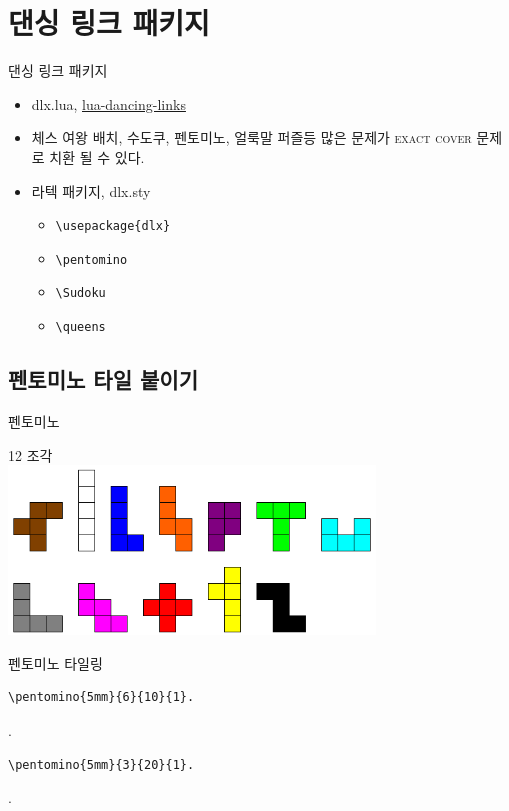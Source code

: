 \documentclass[xcolor=svgnames]{beamer}
\begin{document}
\section{댄싱 링크 패키지}

%
\begin{frame}[fragile]{댄싱 링크 패키지}
  \begin{itemize}
    \setlength\itemsep{1em}
  \item \alert{dlx.lua,} \href{https://github.com/sjnam/lua-dancing-links}
    {lua-dancing-links}
  \item 체스 여왕 배치, 수도쿠, 펜토미노, 얼룩말 퍼즐등 많은 문제가
    \textsc{exact cover} 문제로 치환 될 수 있다.
  \item 라텍 패키지, \alert{dlx.sty}
    \begin{itemize}
    \item \verb|\usepackage{dlx}|
    \item \verb|\pentomino|
    \item \verb|\Sudoku|
    \item \verb|\queens|
    \end{itemize}
  \end{itemize}
\end{frame}


\subsection{펜토미노 타일 붙이기}

%
\begin{frame}{펜토미노}
  \begin{center}
  {\Large 12 조각} \\
  \includegraphics[height=4.5cm]{imgs/pentominoes.png}
  \end{center}
\end{frame}

%
\begin{frame}[fragile]{펜토미노 타일링}
\begin{verbatim}
\pentomino{5mm}{6}{10}{1}.
\end{verbatim}
\vspace{-5mm}
.
\vspace{-5mm}
\begin{verbatim}
\pentomino{5mm}{3}{20}{1}.
\end{verbatim}
\vspace{-5mm}
.
\end{frame}
\end{document}

